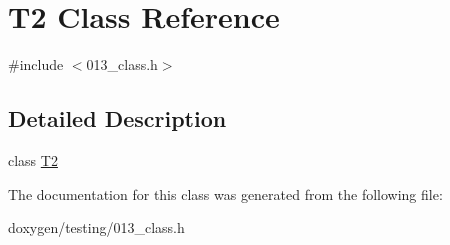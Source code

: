 \hypertarget{class_t2}{}\section{T2 Class Reference}
\label{class_t2}


{\ttfamily \#include $<$013\+\_\+class.\+h$>$}



\subsection{Detailed Description}
class \mbox{\hyperlink{class_t2}{T2}} 

The documentation for this class was generated from the following file\+:\begin{DoxyCompactItemize}
\item 
doxygen/testing/013\+\_\+class.\+h\end{DoxyCompactItemize}
